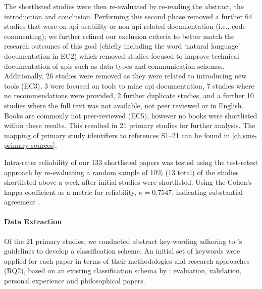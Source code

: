 The shortlisted studies were then re-evaluated by re-reading the abstract, the introduction and conclusion. Performing this second phase removed a further 64 studies that were on \gls{api} usability or non \gls{api}-related  documentation (i.e., code commenting); we further refined our exclusion criteria to better match the research outcomes of this goal (chiefly including the word `natural language' documentation in EC2) which removed studies focused to improve technical documentation of \glspl{api} such as data types and communication schemas. Additionally, 26 studies were removed as they were related to introducing new tools (EC3), 3 were focused on tools to mine \gls{api} documentation, 7 studies where no recommendations were provided, 2 further duplicate studies, and a further 10 studies where the full text was not available, not peer reviewed or in English. Books are commonly not peer-reviewed (EC5), however no books were shortlisted within these results. This resulted in 21 primary studies for further analysis. The mapping of primary study identifiers to references S1--21 can be found in \cref{ch:sms-primary-sources}.

Intra-rater reliability of our 133 shortlisted papers was tested using the test-retest approach \citep{Kitchenham:2007dd} by re-evaluating a random sample of 10\% (13 total) of the studies shortlisted above a week after initial studies were shortlisted. Using the Cohen's kappa coefficient as a metric for reliability, $\kappa=0.7547$, indicating substantial agreement \citep{Landis:1977kv}.

\paragraph{Data Extraction}
\label{esem2019:sec:data-extraction}

Of the 21 primary studies, we conducted abstract key-wording adhering to \citeauthor{Petersen:2008td}'s guidelines \citep{Petersen:2008td} to develop a classification scheme.
An initial set of keywords were applied for each paper in terms of their methodologies and research approaches (RQ2), based on an existing classification schema by \citet{Wieringa:2006vd}: evaluation, validation, personal experience and philosophical papers.

